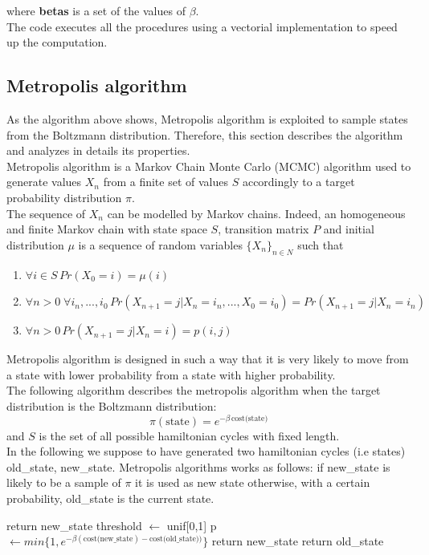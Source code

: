 \documentclass{article}
\begin{document}
\noindent where \textbf{betas} is a set of the values of $\beta$. \\ 
The code executes all the procedures using a vectorial implementation to speed up the computation.

\subsection{Metropolis algorithm}
As the algorithm above shows, Metropolis  algorithm is exploited to sample states from the Boltzmann distribution. Therefore, this section describes the algorithm and analyzes in details its properties.\\
Metropolis algorithm is a Markov Chain Monte Carlo (MCMC) algorithm used to generate values $X_n$ from a finite set of values $S$ accordingly to a target probability distribution $\pi$.  \\
The sequence of  $X_n$ can be modelled by Markov chains. Indeed, an homogeneous and finite Markov chain with state space $S$, transition matrix $P$ and initial distribution $\mu$ is a sequence of random variables $\{ X_n \}_{n \in N}$ such that
\begin{enumerate}
\item $\forall i \in S \, Pr(X_0=i)= \mu(i)$ 
\item $\forall n > 0 \; \forall i_n,...,i_0 \,  Pr(X_{n+1} = j | X_n = i_n,..., X_0=i_0) = Pr(X_{n+1} = j | X_n = i_n)$
\item $\forall n > 0 \, Pr(X_{n+1} = j | X_n = i) = p(i,j) $
\end{enumerate}
Metropolis algorithm is designed in such a way that it is very likely to move from a state with lower probability from a state with higher probability. \\
The following algorithm describes the metropolis algorithm when the target distribution is the Boltzmann distribution:
\begin{equation*}
\pi(\text{state}) = e^{- \beta \, \text{cost(state)}}
\end{equation*}
and $S$ is the set of all possible hamiltonian cycles with fixed length.\\
In the following we suppose to have generated two hamiltonian cycles (i.e states) old\_state, new\_state. Metropolis algorithms works as follows: if new\_state is likely to be a sample of $\pi$ it is used as new state otherwise, with a certain probability, old\_state is the current state.

\begin{algorithm}[H]
    \begin{algorithmic}[1]
      	\State return new\_state
      	\EndIf
        \State threshold $\leftarrow$ unif[0,1]
        \State p  $\leftarrow min\{1,e^{- \beta (\text{cost(new\_state}) - \text{cost(old\_state}))} \}$ 
        	\State return new\_state
        \Else
        	\State return old\_state
        \EndIf
       \EndFunction
\end{algorithmic}
\end{algorithm}
\noindent
\end{document}
